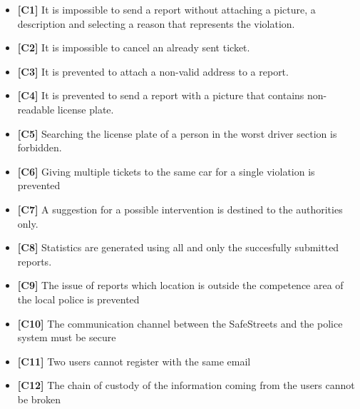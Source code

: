 \begin{itemize}
	\item \textbf{[\hypertarget{C1}{C1}]} It is impossible to send a report without attaching a picture, a description and selecting a reason that represents the violation. 
	\item \textbf{[\hypertarget{C2}{C2}]} It is impossible to cancel an already sent ticket. 
	\item \textbf{[\hypertarget{C3}{C3}]} It is prevented to attach a non-valid address to a report.
	\item \textbf{[\hypertarget{C4}{C4}]} It is prevented to send a report with a picture that contains non-readable license plate. 
	\item \textbf{[\hypertarget{C5}{C5}]} Searching the license plate of a person in the worst driver section is forbidden.
	\item \textbf{[\hypertarget{C6}{C6}]} Giving multiple tickets to the same car for a single violation is prevented
	\item \textbf{[\hypertarget{C7}{C7}]} A suggestion for a possible intervention is destined to the authorities only.
	\item \textbf{[\hypertarget{C8}{C8}]} Statistics are generated using all and only the succesfully submitted reports.
	\item \textbf{[\hypertarget{C9}{C9}]} The issue of reports which location is outside the competence area of the local police is prevented
	\item \textbf{[\hypertarget{C10}{C10}]} The communication channel between the SafeStreets and the police system must be secure
	\item \textbf{[\hypertarget{C11}{C11}]} Two users cannot register with the same email
	\item \textbf{[\hypertarget{C12}{C12}]} The chain of custody of the information coming from the users cannot be broken
\end{itemize}
\clearpage
